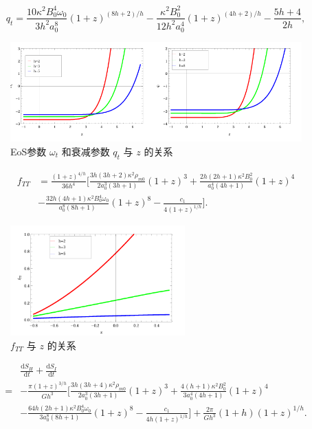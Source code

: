 \documentclass[aps,prl,preprint,groupedaddress,showkeys]{revtex4-2}
\begin{document}
$$
q_t
=\frac{10\kappa^2 B_0^4 \omega_0 }{3h^2 a_0^8 } (1+z)^{(8h+2)/h} - \frac{\kappa^2 B_0^2 }{12 h^2 a_0^4 } (1+z)^{(4h+2)/h} - \frac{5h+4 }{2h } ,
$$

\begin{figure}
    \centering
    \includegraphics[width=1.0\textwidth]{fig/fig11.png}
    \caption{EoS参数 $\omega_t$ 和衰减参数 $q_t$ 与 $z$ 的关系}
\end{figure}

$$
\begin{aligned}
    f_{TT}
    &=\frac{(1+z)^{4/h} }{36h^4 } \bigg[\frac{3h(3h+2)\kappa^2\rho_{m0} }{2a_0^3(3h+1) }(1+z)^3 + \frac{2h(2h+1)\kappa^2 B_0^2 }{a_0^4(4h+1) } (1+z)^4 \\
    &- \frac{32h(4h+1)\kappa^2 B_0^4 \omega_0 }{a_0^8 (8h+1) } (1+z)^8 - \frac{c_1 }{4(1+z)^{1/h} }   \bigg].
\end{aligned}
$$
\begin{figure}
    \centering
    \includegraphics[width=0.6\textwidth]{fig/fig12.png}
    \caption{$f_{TT}$ 与 $z$ 的关系}
\end{figure}

$$
\begin{aligned}
    &\frac{\mathrm{d}S_H }{\mathrm{d}t } + \frac{\mathrm{d}S_I }{\mathrm{d}t } \\
    =&-\frac{\pi(1+z)^{3/h} }{Gh^3 } \bigg[\frac{3h(3h+4)\kappa^2\rho_{m0} }{2a_0^3(3h+1) }(1+z)^3 + \frac{4(h+1)\kappa^2 B_0^2 }{3a_0^4(4h+1) } (1+z)^4 \\
    &- \frac{64h(2h+1)\kappa^2 B_0^4 \omega_0 }{3a_0^8 (8h+1) } (1+z)^8- \frac{c_1 }{4h(1+z)^{1/h} } \bigg] + \frac{2\pi }{G h^3 } (1+h)(1+z)^{1/h}.
\end{aligned}
$$
\end{document}
